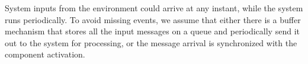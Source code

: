 

System inputs from the environment could arrive at any instant, while the system runs periodically. To avoid missing events, we assume that either there is a buffer mechanism that stores all the input messages on a queue and periodically send it out to the system for processing, or the message arrival is synchronized with the component activation. %

